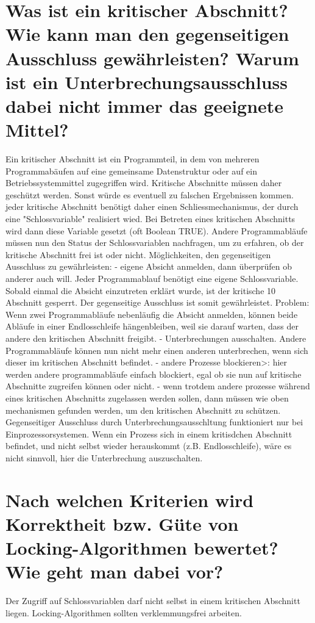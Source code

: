 \documentclass[12pt,a4paper,ngerman]{scrartcl}
\newcommand{\question}[1]{#1}
\newenvironment {answer}
                {}
                {}
\begin{document}
\section{\question{Was ist ein kritischer Abschnitt? Wie kann man den gegenseitigen Ausschluss gewährleisten? Warum ist ein Unterbrechungsausschluss dabei nicht immer das geeignete Mittel?}}
\begin{answer}
Ein kritischer Abschnitt ist ein Programmteil, in dem von mehreren Programmabäufen auf eine gemeinsame
Datenstruktur oder auf ein Betriebssystemmittel zugegriffen wird. Kritische Abschnitte
müssen daher geschützt werden. Sonst würde es eventuell zu falschen Ergebnissen kommen. jeder
kritische Abschnitt benötigt daher einen Schliessmechanismus, der durch eine "Schlossvariable"
realisiert wied. Bei Betreten eines kritischen Abschnitts wird dann diese Variable gesetzt (oft Boolean
TRUE). Andere Programmabläufe müssen nun den Status der Schlossvariablen nachfragen,
um zu erfahren, ob der kritische Abschnitt frei ist oder nicht.
Möglichkeiten, den gegenseitigen Ausschluss zu gewährleisten:
- eigene Absicht anmelden, dann überprüfen ob anderer auch will. Jeder Programmablauf benötigt
eine eigene Schlossvariable. Sobald einmal die Absicht einzutreten erklärt wurde, ist der kritische
10
Abschnitt gesperrt. Der gegenseitige Ausschluss ist somit gewährleistet.
Problem: Wenn zwei Programmabläufe nebenläufig die Absicht anmelden, können beide Abläufe
in einer Endlosschleife hängenbleiben, weil sie darauf warten, dass der andere den kritischen Abschnitt
freigibt.
- Unterbrechungen ausschalten. Andere Programmabläufe können nun nicht mehr einen anderen
unterbrechen, wenn sich dieser im kritischen Abschnitt befindet.
- andere Prozesse blockieren>: hier werden andere programmabläufe einfach blockiert, egal ob sie
nun auf kritische Abschnitte zugreifen können oder nicht.
- wenn trotdem andere prozesse während eines kritischen Abschnitts zugelassen werden sollen,
dann müssen wie oben mechanismen gefunden werden, um den kritischen Abschnitt zu schützen.
Gegenseitiger Ausschluss durch Unterbrechungsausschltung funktioniert nur bei Einprozessorsystemen.
Wenn ein Prozess sich in einem kritisdchen Abschnitt befindet, und nicht selbst wieder
herauskommt (z.B. Endlosschleife), wäre es nicht sinnvoll, hier die Unterbrechung auszuschalten.
\end{answer}

\section{\question{Nach welchen Kriterien wird Korrektheit bzw. Güte von Locking-Algorithmen bewertet? Wie geht man dabei vor?}}
\begin{answer}
Der Zugriff auf Schlossvariablen darf nicht selbst in einem kritischen Abschnitt liegen. Locking-Algorithmen sollten verklemmungsfrei arbeiten.
\end{answer}
\end{document}
